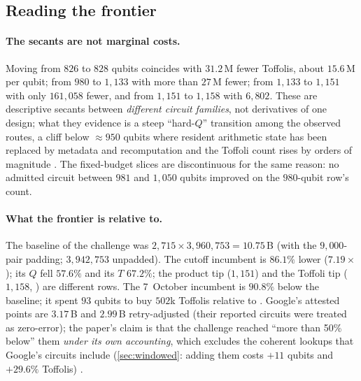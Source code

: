 \subsection{Reading the frontier}

\paragraph{The secants are not marginal costs.} Moving from $826$ to $828$ qubits coincides with $31.2$\,M fewer Toffolis, about $15.6$\,M per qubit; from $980$ to $1{,}133$ with more than $27$\,M fewer; from $1{,}133$ to $1{,}151$ with only $161{,}058$ fewer, and from $1{,}151$ to $1{,}158$ with $6{,}802$. These are descriptive secants between \emph{different circuit families}, not derivatives of one design; what they evidence is a steep ``hard-$Q$'' transition among the observed routes, a cliff below $\approx950$ qubits where resident arithmetic state has been replaced by metadata and recomputation and the Toffoli count rises by orders of magnitude \cite{ecdsafail-supp}. The fixed-budget slices are discontinuous for the same reason: no admitted circuit between $981$ and $1{,}050$ qubits improved on the $980$-qubit row's count.

\paragraph{What the frontier is relative to.} The baseline of the challenge was $2{,}715\times3{,}960{,}753=10.75$\,B (with the $9{,}000$-pair  padding; $3{,}942{,}753$ unpadded). The cutoff incumbent  is $86.1\%$ lower ($7.19\times$); its $Q$ fell $57.6\%$ and its $T$ $67.2\%$; the product tip ($1{,}151$) and the Toffoli tip ($1{,}158$, ) are different rows. The 7~October incumbent  is $90.8\%$ below the baseline; it spent $93$ qubits to buy $502$k Toffolis relative to . Google's attested points are $3.17$\,B and $2.99$\,B retry-adjusted (their reported circuits were treated as zero-error); the paper's claim is that the challenge reached ``more than 50\% below'' them \emph{under its own accounting}, which excludes the coherent lookups that Google's circuits include (\cref{sec:windowed}: adding them costs $+11$ qubits and $+29.6\%$ Toffolis) \cite{ecdsafail26}.

